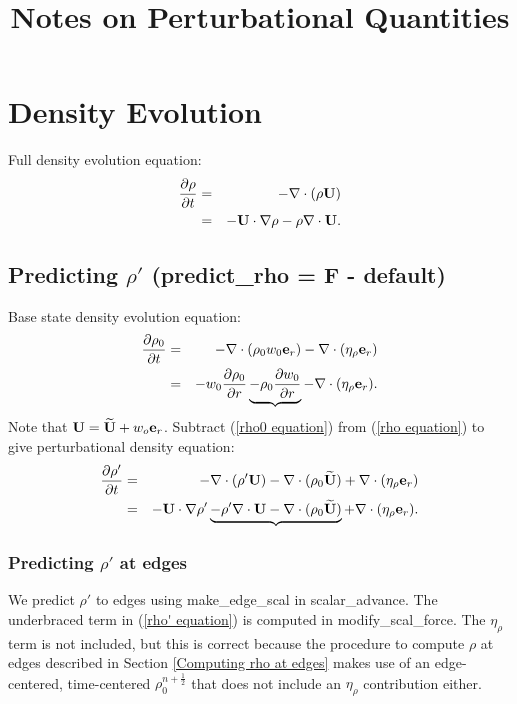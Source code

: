 \documentclass[11pt]{article}
\title{Notes on Perturbational Quantities}
\def\half  {\frac{1}{2}}
\def\eb    {{\bf e}}
\def\Ub    {{\bf U}}
\def\Ubt   {\widetilde{\bf U}}
\begin{document}
\maketitle
\tableofcontents
\cleardoublepage

\section{Density Evolution}
Full density evolution equation:
\begin{eqnarray}
\frac{\partial\rho}{\partial t} &=& -\nabla\cdot(\rho\Ub) \nonumber \\
&=& -\Ub\cdot\nabla\rho -\rho\nabla\cdot\Ub. \label{rho equation}
\end{eqnarray}
\subsection{Predicting $\rho'$ (predict\_rho = F - default)}
Base state density evolution equation:
\begin{eqnarray}
\frac{\partial\rho_0}{\partial t} &=& -\nabla\cdot(\rho_0 w_0 \eb_r) - \nabla\cdot(\eta_\rho \eb_r) \nonumber \\
&=& -w_0\frac{\partial\rho_0}{\partial r} \underbrace{- \rho_0\frac{\partial w_0}{\partial r}} - \nabla\cdot(\eta_\rho \eb_r). \label{rho0 equation}
\end{eqnarray}
Note that $\Ub = \Ubt + w_o\eb_r$.  Subtract (\ref{rho0 equation}) from (\ref{rho equation}) to give perturbational density equation:
\begin{eqnarray}
\frac{\partial\rho'}{\partial t} &=& -\nabla\cdot(\rho'\Ub) - \nabla\cdot(\rho_0\Ubt) + \nabla\cdot(\eta_\rho \eb_r) \nonumber \\
&=& -\Ub\cdot\nabla\rho' \underbrace{- \rho'\nabla\cdot\Ub - \nabla\cdot(\rho_0\Ubt)} + \nabla\cdot(\eta_\rho \eb_r).\label{rho' equation}
\end{eqnarray}
\subsubsection{Predicting $\rho'$ at edges}
We predict $\rho'$ to edges using make\_edge\_scal in scalar\_advance.  The underbraced term in (\ref{rho' equation}) is computed in modify\_scal\_force.  The $\eta_\rho$ term is not included, but this is correct because the procedure to compute $\rho$ at edges described in Section \ref{Computing rho at edges} makes use of an edge-centered, time-centered $\rho_0^{n+\half}$ that does not include an $\eta_\rho$ contribution either.
\end{document}
